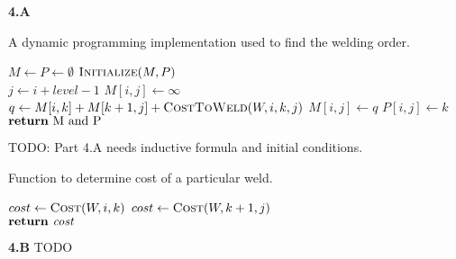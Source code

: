 \documentclass{article}
\begin{document}
\textbf{4.A}

\begin{algorithm}[H]
    \caption{
        A dynamic programming implementation used to
        find the welding order.
    }
    \label{alg:algorithm-label}
    \begin{algorithmic}[1]
            \State $ M \gets P \gets \emptyset $
            \State $ \Call{Initialize}{M, P} $ 
            \\
                    \State $ j \gets i + level - 1 $                 
                    \State $ M[i, j] \gets \infty $
                        \State $ q \gets M[i, k] + M[k + 1, j] + \Call{CostToWeld}{W, i, k, j} $
                            \State $ M[i, j] \gets q $
                            \State $ P[i, j] \gets k $ 
                        \EndIf
                    \EndFor                    
                \EndFor
            \EndFor
            \\
            \State $ \Return \text{ M and P} $
        \EndFunction
    \end{algorithmic}
\end{algorithm}

TODO: Part 4.A needs inductive formula and initial conditions.

\begin{algorithm}[H]
    \caption{
        Function to determine cost of a particular weld.
    }
    \label{alg:algorithm-label}
    \begin{algorithmic}[1]
            \State $ cost \gets \Call{Cost}{W, i, k} $
                \State $ cost \gets \Call{Cost}{W, k + 1, j} $
            \EndIf
            \\
            \State $ \Return \textit{ cost} $
        \EndFunction
    \end{algorithmic}
\end{algorithm}


\textbf{4.B} TODO
\end{document}
